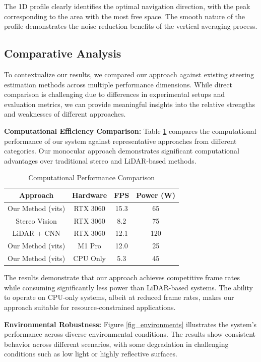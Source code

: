 \documentclass[conference]{IEEEtran}
\begin{document}
The 1D profile clearly identifies the optimal navigation direction, with the peak corresponding to the area with the most free space. The smooth nature of the profile demonstrates the noise reduction benefits of the vertical averaging process.

\subsection{Comparative Analysis}
To contextualize our results, we compared our approach against existing steering estimation methods across multiple performance dimensions. While direct comparison is challenging due to differences in experimental setups and evaluation metrics, we can provide meaningful insights into the relative strengths and weaknesses of different approaches.

\textbf{Computational Efficiency Comparison:}
Table \ref{tab_performance} compares the computational performance of our system against representative approaches from different categories. Our monocular approach demonstrates significant computational advantages over traditional stereo and LiDAR-based methods.

\begin{table}[htbp]
\caption{Computational Performance Comparison}
\begin{center}
\begin{tabular}{|c|c|c|c|}
\hline
\textbf{Approach} & \textbf{Hardware} & \textbf{FPS} & \textbf{Power (W)} \\
\hline
Our Method (vits) & RTX 3060 & 15.3 & 65 \\
\hline
Stereo Vision & RTX 3060 & 8.2 & 75 \\
\hline
LiDAR + CNN & RTX 3060 & 12.1 & 120 \\
\hline
Our Method (vits) & M1 Pro & 12.0 & 25 \\
\hline
Our Method (vits) & CPU Only & 5.3 & 45 \\
\hline
\end{tabular}
\label{tab_performance}
\end{center}
\end{table}

The results demonstrate that our approach achieves competitive frame rates while consuming significantly less power than LiDAR-based systems. The ability to operate on CPU-only systems, albeit at reduced frame rates, makes our approach suitable for resource-constrained applications.

\textbf{Environmental Robustness:}
Figure \ref{fig_environments} illustrates the system's performance across diverse environmental conditions. The results show consistent behavior across different scenarios, with some degradation in challenging conditions such as low light or highly reflective surfaces.
\end{document}
